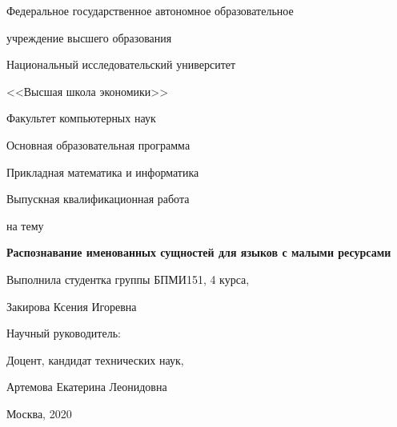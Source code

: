
\large
\bigskip

\begin{center}
{\large Федеральное государственное автономное образовательное 

учреждение высшего образования

Национальный исследовательский университет

\smallskip

<<Высшая школа экономики>>

}

\bigskip
\bigskip
\bigskip

{ \large
Факультет компьютерных наук

Основная образовательная программа

Прикладная математика и информатика
}
\end{center}

\begin{center}
  {\large Выпускная квалификационная работа}
  
  {\large на тему}
\end{center}

\begin{center}
  \textbf{\huge Распознавание именованных сущностей для языков с малыми ресурсами}
\end{center}


\renewcommand{\arraystretch}{1.8} %

\bigskip
\bigskip
\bigskip
\bigskip

{\large Выполнила студентка группы БПМИ151, 4 курса,

\hspace{3cm} Закирова Ксения Игоревна


Научный руководитель:

\hspace{3cm} Доцент, кандидат технических наук,

\hspace{3cm} Артемова Екатерина Леонидовна


}
    
\bigskip
\bigskip

\bigskip
\bigskip
\bigskip
\pagestyle{empty}

\vfill
\begin{center}
  {Москва, 2020}
\end{center}

\newpage